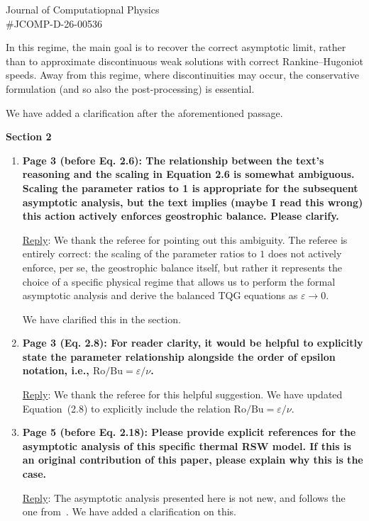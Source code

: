 \documentclass[letter,11pt]{letter}
\begin{document}
\begin{letter}{Journal of Computatiopnal Physics\\\#JCOMP-D-26-00536}
\begin{enumerate}
In this regime, the main goal is to recover the correct asymptotic limit, rather than to approximate discontinuous weak solutions with correct Rankine--Hugoniot speeds. Away from this regime, where discontinuities may occur, the conservative formulation (and so also the post-processing) is essential.

We have added a clarification after the aforementioned passage.


\end{enumerate}

{\bf Section 2}
\begin{enumerate}
	\medskip
	\item
	{\bf Page 3 (before Eq. 2.6): The relationship between the text’s reasoning and the scaling in Equation 2.6 is somewhat ambiguous. Scaling the parameter ratios to 1 is appropriate for the subsequent asymptotic analysis, but the text implies (maybe I read this wrong) this action actively enforces geostrophic balance. Please clarify.}
	
	\medskip
	{\sc\underline{Reply}}: We thank the referee for pointing out this ambiguity. The referee is entirely correct: the scaling of the parameter ratios to $1$ does not actively enforce, per se, the geostrophic balance itself, but rather it represents the choice of a specific physical regime that allows us to perform the formal asymptotic analysis and derive the balanced TQG equations as $\varepsilon \to 0$.
	
	We have clarified this in the section.

	
	\item 
	{\bf Page 3 (Eq. 2.8): For reader clarity, it would be helpful to explicitly state the parameter relationship alongside the order of epsilon notation, i.e., $\mathrm{Ro} / \mathrm{Bu} = \varepsilon / \nu$.}
	
	
	\medskip
	{\sc\underline{Reply}}: We thank the referee for this helpful suggestion. We have updated Equation~(2.8) to explicitly include the relation $\mathrm{Ro} / \mathrm{Bu} = \varepsilon / \nu$.
	
	\item 
	{\bf Page 5 (before Eq. 2.18): Please provide explicit references for the asymptotic analysis of this specific thermal RSW model. If this is an original contribution of this paper, please explain why this is the case.}
    
    \medskip
    {\sc\underline{Reply}}: The asymptotic analysis presented here is not new, and follows the one from~\cite{Warneford_2013}. We have added a clarification on this.
    

\end{enumerate}
\end{letter}
\end{document}
